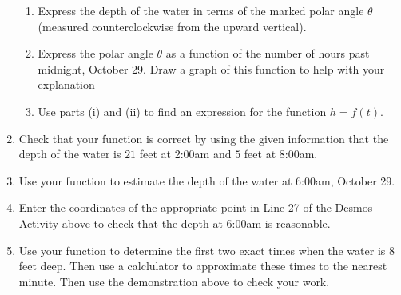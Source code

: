 \documentclass{ximera}
\begin{document}
\begin{example}
\begin{explanation}
\begin{enumerate}
\begin{enumerate}
\item Express the depth of the water in terms of the marked polar angle $\theta$ (measured counterclockwise from the upward vertical).

\item Express the polar angle $\theta$ as a function of the number of hours past midnight, October 29. Draw a graph of this function to help with your explanation

\item Use parts (i) and (ii) to find an expression for the function $h=f(t)$.
\end{enumerate}


\item Check that your function is correct by using the given information that the depth of the water is $21$ feet at 2:00am and $5$ feet at 8:00am.


\item Use your function to estimate the depth of the water at 6:00am, October 29.

\item Enter the coordinates of the appropriate point in Line 27 of the Desmos Activity above to check that the depth at 6:00am is reasonable.

\item Use your function to determine the first two exact times when the water is $8$ feet deep. Then use a calclulator to approximate these times to the nearest minute. Then use the demonstration above to check your work.

\end{enumerate}

\end{explanation}

\end{example}
\end{document}
